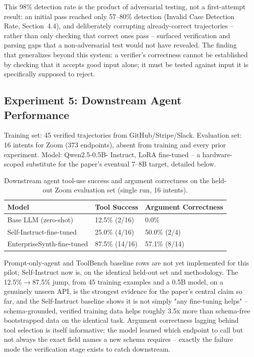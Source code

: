 \documentclass[11pt]{article}
\begin{document}
This 98\% detection rate is the product of adversarial testing, not a first-attempt result: an
initial pass reached only 57--80\% detection (Invalid Case Detection Rate, Section~4.4), and
deliberately corrupting already-correct trajectories -- rather than only checking that correct
ones pass -- surfaced verification and parsing gaps that a non-adversarial test would not have
revealed. The finding that generalizes beyond this system: a verifier's correctness cannot be
established by checking that it accepts good input alone; it must be tested against input it is
specifically supposed to reject.

\subsection{Experiment 5: Downstream Agent Performance}
Training set: 45 verified trajectories from GitHub/Stripe/Slack. Evaluation set: 16 intents for
Zoom (373 endpoints), absent from training and every prior experiment. Model: Qwen2.5-0.5B-
Instruct, LoRA fine-tuned -- a hardware-scoped substitute for the paper's eventual 7--8B target,
detailed below.

\begin{table}[htbp]
\centering
\caption{Downstream agent tool-use success and argument correctness on the held-out Zoom
evaluation set (single run, 16 intents).}
\label{tab:downstream-zoom}
\begin{tabular}{lll}
\toprule
\textbf{Model} & \textbf{Tool Success} & \textbf{Argument Correctness} \\
\midrule
Base LLM (zero-shot) & 12.5\% (2/16) & 0.0\% \\
Self-Instruct-fine-tuned & 25.0\% (4/16) & 50.0\% (2/4) \\
EnterpriseSynth-fine-tuned & 87.5\% (14/16) & 57.1\% (8/14) \\
\bottomrule
\end{tabular}
\end{table}

Prompt-only-agent and ToolBench baseline rows are not yet implemented for this pilot; Self-Instruct
now is, on the identical held-out set and methodology. The 12.5\%$\rightarrow$87.5\% jump, from 45
training examples and a 0.5B model, on a genuinely unseen API, is the strongest evidence for the
paper's central claim so far, and the Self-Instruct baseline shows it is not simply "any
fine-tuning helps" -- schema-grounded, verified training data helps roughly 3.5x more than
schema-free bootstrapped data on the identical task. Argument correctness lagging behind tool
selection is itself informative: the model learned which endpoint to call but not always the
exact field names a new schema requires -- exactly the failure mode the verification stage exists
to catch downstream.
\end{document}
